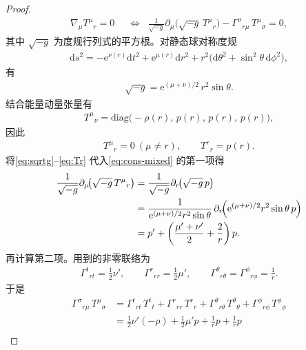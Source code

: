 \begin{proof}
    \begin{align}
    \nabla_{\mu}T^{\mu}{}_{r}=0
    &\;\;\Longleftrightarrow\;\;
    \frac{1}{\sqrt{-g}}\partial_{\mu}\!\bigl(\sqrt{-g}\,T^{\mu}{}_{r}\bigr)
    -\Gamma^{\sigma}{}_{r\mu}\,T^{\mu}{}_{\sigma}=0,\label{eq:cons-mixed}
    \end{align}
    其中 $\sqrt{-g}$ 为度规行列式的平方根。对静态球对称度规
\begin{align}
\mathrm{d}s^{2}=-\mathrm{e}^{\nu(r)}\mathrm{d}t^{2}+\mathrm{e}^{\mu(r)}\mathrm{d}r^{2}
+r^{2}\bigl(\mathrm{d}\theta^{2}+\sin^{2}\theta\,\mathrm{d}\phi^{2}\bigr),\label{eq:metric-munu}
\end{align}
有
\begin{align}
\sqrt{-g}=\mathrm{e}^{(\mu+\nu)/2}\,r^{2}\sin\theta.\label{eq:sqrtg}
\end{align}
结合能量动量张量有
\begin{align}
T^{\mu}{}_{\nu}=\mathrm{diag}\bigl(-\rho(r),\,p(r),\,p(r),\,p(r)\bigr),\label{eq:T-mixed}
\end{align}
因此
\begin{align}
T^{\mu}{}_{r}=0\ (\mu\neq r),\qquad T^{r}{}_{r}=p(r).\label{eq:Tr}
\end{align}
将\eqref{eq:sqrtg}--\eqref{eq:Tr} 代入\eqref{eq:cons-mixed} 的第一项得
\begin{align}
\frac{1}{\sqrt{-g}}\partial_{\mu}\!\bigl(\sqrt{-g}\,T^{\mu}{}_{r}\bigr)
&=\frac{1}{\sqrt{-g}}\partial_{r}\!\bigl(\sqrt{-g}\,p\bigr)\nonumber\\
&=\frac{1}{\mathrm{e}^{(\mu+\nu)/2}r^{2}\sin\theta}\,
\partial_{r}\!\Bigl(\mathrm{e}^{(\mu+\nu)/2}r^{2}\sin\theta\,p\Bigr)\nonumber\\
&=p'+\left(\frac{\mu'+\nu'}{2}+\frac{2}{r}\right)p.\label{eq:first-term}
\end{align}
再计算第二项。用到的非零联络为
\begin{align}
\Gamma^{t}{}_{rt}=\tfrac{1}{2}\nu',\qquad
\Gamma^{r}{}_{rr}=\tfrac{1}{2}\mu',\qquad
\Gamma^{\theta}{}_{r\theta}=\Gamma^{\phi}{}_{r\phi}=\frac{1}{r}.\label{eq:gamma-needed}
\end{align}
于是
\begin{align}
\Gamma^{\sigma}{}_{r\mu}\,T^{\mu}{}_{\sigma}
&=\Gamma^{t}{}_{rt}\,T^{t}{}_{t}
+\Gamma^{r}{}_{rr}\,T^{r}{}_{r}
+\Gamma^{\theta}{}_{r\theta}\,T^{\theta}{}_{\theta}
+\Gamma^{\phi}{}_{r\phi}\,T^{\phi}{}_{\phi}\nonumber\\
&=\tfrac{1}{2}\nu'(-\rho)+\tfrac{1}{2}\mu' p+\frac{1}{r}p+\frac{1}{r}p\label{eq:second-term}\\

\end{align}
\end{proof}
